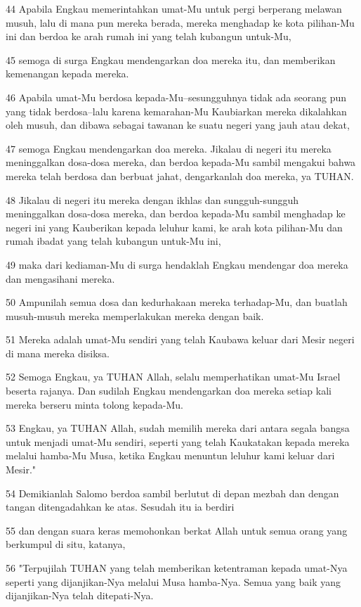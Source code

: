 \par 44 Apabila Engkau memerintahkan umat-Mu untuk pergi berperang melawan musuh, lalu di mana pun mereka berada, mereka menghadap ke kota pilihan-Mu ini dan berdoa ke arah rumah ini yang telah kubangun untuk-Mu,
\par 45 semoga di surga Engkau mendengarkan doa mereka itu, dan memberikan kemenangan kepada mereka.
\par 46 Apabila umat-Mu berdosa kepada-Mu--sesungguhnya tidak ada seorang pun yang tidak berdosa--lalu karena kemarahan-Mu Kaubiarkan mereka dikalahkan oleh musuh, dan dibawa sebagai tawanan ke suatu negeri yang jauh atau dekat,
\par 47 semoga Engkau mendengarkan doa mereka. Jikalau di negeri itu mereka meninggalkan dosa-dosa mereka, dan berdoa kepada-Mu sambil mengakui bahwa mereka telah berdosa dan berbuat jahat, dengarkanlah doa mereka, ya TUHAN.
\par 48 Jikalau di negeri itu mereka dengan ikhlas dan sungguh-sungguh meninggalkan dosa-dosa mereka, dan berdoa kepada-Mu sambil menghadap ke negeri ini yang Kauberikan kepada leluhur kami, ke arah kota pilihan-Mu dan rumah ibadat yang telah kubangun untuk-Mu ini,
\par 49 maka dari kediaman-Mu di surga hendaklah Engkau mendengar doa mereka dan mengasihani mereka.
\par 50 Ampunilah semua dosa dan kedurhakaan mereka terhadap-Mu, dan buatlah musuh-musuh mereka memperlakukan mereka dengan baik.
\par 51 Mereka adalah umat-Mu sendiri yang telah Kaubawa keluar dari Mesir negeri di mana mereka disiksa.
\par 52 Semoga Engkau, ya TUHAN Allah, selalu memperhatikan umat-Mu Israel beserta rajanya. Dan sudilah Engkau mendengarkan doa mereka setiap kali mereka berseru minta tolong kepada-Mu.
\par 53 Engkau, ya TUHAN Allah, sudah memilih mereka dari antara segala bangsa untuk menjadi umat-Mu sendiri, seperti yang telah Kaukatakan kepada mereka melalui hamba-Mu Musa, ketika Engkau menuntun leluhur kami keluar dari Mesir."
\par 54 Demikianlah Salomo berdoa sambil berlutut di depan mezbah dan dengan tangan ditengadahkan ke atas. Sesudah itu ia berdiri
\par 55 dan dengan suara keras memohonkan berkat Allah untuk semua orang yang berkumpul di situ, katanya,
\par 56 "Terpujilah TUHAN yang telah memberikan ketentraman kepada umat-Nya seperti yang dijanjikan-Nya melalui Musa hamba-Nya. Semua yang baik yang dijanjikan-Nya telah ditepati-Nya.
